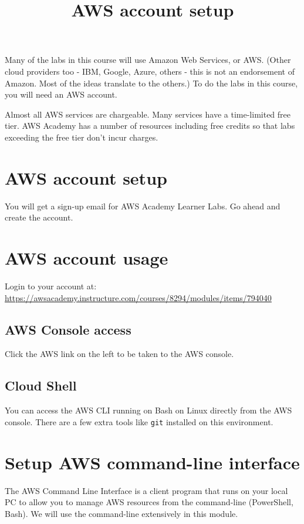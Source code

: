 \documentclass{pgnotes}
\title{AWS account setup}
\begin{document}
\maketitle

Many of the labs in this course will use Amazon Web Services, or AWS.
(Other cloud providers too - IBM, Google, Azure, others - this is not an endorsement of Amazon.
Most of the ideas translate to the others.)
To do the labs in this course, you will need an AWS account.

Almost all AWS services are chargeable.
Many services have a time-limited free tier.
AWS Academy has a number of resources including free credits so that labs exceeding the free tier don't incur charges.


\section{AWS account setup}
\label{sec:aws-account-setup}

You will get a sign-up email for AWS Academy Learner Labs.
Go ahead and create the account.

\section{AWS account usage}

Login to your account at:\\
\url{https://awsacademy.instructure.com/courses/8294/modules/items/794040}

\subsection{AWS Console access}

Click the AWS link on the left to be taken to the AWS console. 

\subsection{Cloud Shell}

You can access the AWS CLI running on Bash on Linux directly from the AWS console. There are a few extra tools like \texttt{git} installed on this environment.


\section{Setup AWS command-line interface}

The AWS Command Line Interface is a client program that runs on your local PC to allow you to manage AWS resources from the command-line (PowerShell, Bash).
We will use the command-line extensively in this module.
\end{document}
